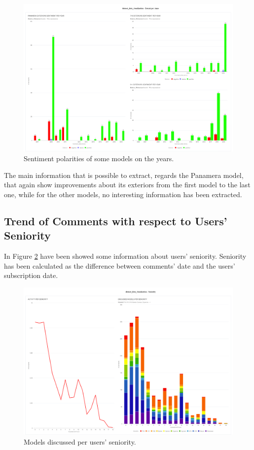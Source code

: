 \begin{figure}[H]
	\centering
	\includegraphics[width=\textwidth]{figures/odv_export/dataset_data_visualization_5.pdf}
	\caption{Sentiment polarities of some models on the years.}
	\label{fig:ext-year-snt}
\end{figure}

The main information that is possible to extract, regards the Panamera model, that again show improvements about its exteriors from the first model to the last one, while for the other models, no interesting information has been extracted.



\subsection{Trend of Comments with respect to Users' Seniority}

In Figure \ref{fig:model-senior} have been showed some information about users' seniority. Seniority has been calculated as the difference between comments' date and the users' subscription date.

\begin{figure}[H]
	\centering
	\includegraphics[width=\textwidth]{figures/odv_export/dataset_data_visualization_9.pdf}
	\caption{Models discussed per users' seniority.}
	\label{fig:model-senior}
\end{figure}

